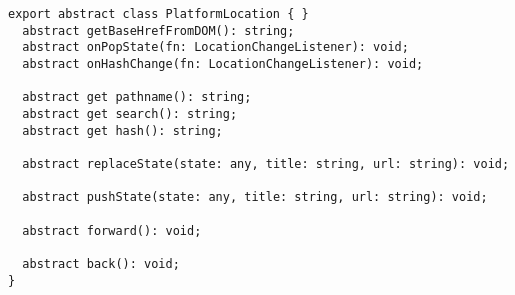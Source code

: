 \begin{verbatim}
export abstract class PlatformLocation { }
  abstract getBaseHrefFromDOM(): string;
  abstract onPopState(fn: LocationChangeListener): void;
  abstract onHashChange(fn: LocationChangeListener): void;

  abstract get pathname(): string;
  abstract get search(): string;
  abstract get hash(): string;

  abstract replaceState(state: any, title: string, url: string): void;

  abstract pushState(state: any, title: string, url: string): void;

  abstract forward(): void;

  abstract back(): void;
}
\end{verbatim}
